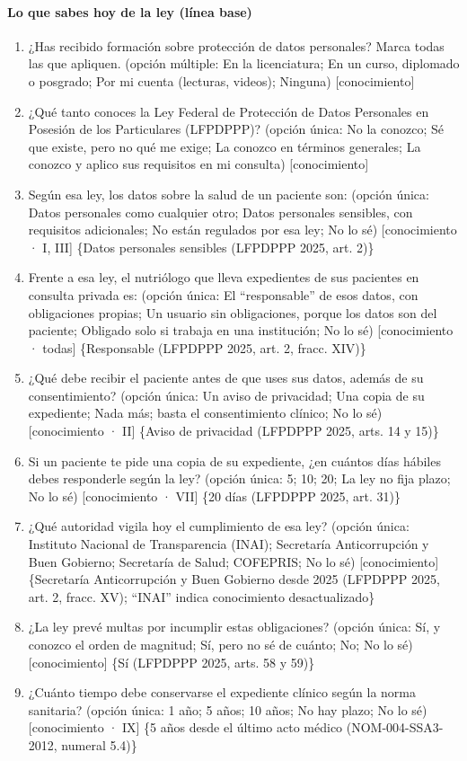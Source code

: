 \documentclass[12pt, a4paper]{article}
\begin{document}
\paragraph{Lo que sabes hoy de la ley (línea base)}
\begin{enumerate}
  \item ¿Has recibido formación sobre protección de datos personales? Marca todas las que apliquen. (opción múltiple: En la licenciatura; En un curso, diplomado o posgrado; Por mi cuenta (lecturas, videos); Ninguna) [conocimiento]
  \item ¿Qué tanto conoces la Ley Federal de Protección de Datos Personales en Posesión de los Particulares (LFPDPPP)? (opción única: No la conozco; Sé que existe, pero no qué me exige; La conozco en términos generales; La conozco y aplico sus requisitos en mi consulta) [conocimiento]
  \item Según esa ley, los datos sobre la salud de un paciente son: (opción única: Datos personales como cualquier otro; Datos personales sensibles, con requisitos adicionales; No están regulados por esa ley; No lo sé) [conocimiento · I, III] \{Datos personales sensibles (LFPDPPP 2025, art. 2)\}
  \item Frente a esa ley, el nutriólogo que lleva expedientes de sus pacientes en consulta privada es: (opción única: El ``responsable'' de esos datos, con obligaciones propias; Un usuario sin obligaciones, porque los datos son del paciente; Obligado solo si trabaja en una institución; No lo sé) [conocimiento · todas] \{Responsable (LFPDPPP 2025, art. 2, fracc. XIV)\}
  \item ¿Qué debe recibir el paciente antes de que uses sus datos, además de su consentimiento? (opción única: Un aviso de privacidad; Una copia de su expediente; Nada más; basta el consentimiento clínico; No lo sé) [conocimiento · II] \{Aviso de privacidad (LFPDPPP 2025, arts. 14 y 15)\}
  \item Si un paciente te pide una copia de su expediente, ¿en cuántos días hábiles debes responderle según la ley? (opción única: 5; 10; 20; La ley no fija plazo; No lo sé) [conocimiento · VII] \{20 días (LFPDPPP 2025, art. 31)\}
  \item ¿Qué autoridad vigila hoy el cumplimiento de esa ley? (opción única: Instituto Nacional de Transparencia (INAI); Secretaría Anticorrupción y Buen Gobierno; Secretaría de Salud; COFEPRIS; No lo sé) [conocimiento] \{Secretaría Anticorrupción y Buen Gobierno desde 2025 (LFPDPPP 2025, art. 2, fracc. XV); ``INAI'' indica conocimiento desactualizado\}
  \item ¿La ley prevé multas por incumplir estas obligaciones? (opción única: Sí, y conozco el orden de magnitud; Sí, pero no sé de cuánto; No; No lo sé) [conocimiento] \{Sí (LFPDPPP 2025, arts. 58 y 59)\}
  \item ¿Cuánto tiempo debe conservarse el expediente clínico según la norma sanitaria? (opción única: 1 año; 5 años; 10 años; No hay plazo; No lo sé) [conocimiento · IX] \{5 años desde el último acto médico (NOM-004-SSA3-2012, numeral 5.4)\}
\end{enumerate}
 
\end{document}
